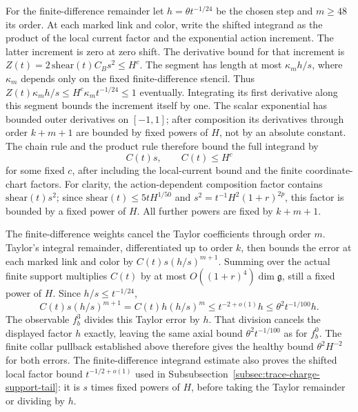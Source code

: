 For the finite-difference remainder let $h=\theta t^{-1/24}$ be the
chosen step and $m\ge48$ its order. At each marked link and color,
write the shifted integrand as the product of the local current factor
and the exponential action increment. The latter increment is zero at
zero shift. The derivative bound for that increment is
$Z(t)=2\,\mathrm{shear}(t)C_Bs^2\le H^c$. The segment has length at
most $\kappa_m h/s$, where $\kappa_m$ depends only on the fixed
finite-difference stencil. Thus
$Z(t)\kappa_m h/s\le H^c\kappa_m t^{-1/24}\le1$ eventually.
Integrating its first derivative along this segment bounds the increment
itself by one. The scalar exponential has bounded outer derivatives on
$[-1,1]$; after composition its derivatives through order $k+m+1$ are
bounded by fixed powers of $H$, not by an absolute constant. The chain
rule and the product rule therefore bound the full integrand by
\[
 C(t)s,\qquad C(t)\le H^c
\]
for some fixed $c$, after including the local-current bound and the
finite coordinate-chart factors. For clarity, the action-dependent
composition factor contains $\mathrm{shear}(t)s^2$; since
$\mathrm{shear}(t)\le5tH^{1/50}$ and
$s^2=t^{-1}H^2(1+r)^{2p}$, this factor is bounded by a fixed power of
$H$. All further powers are fixed by $k+m+1$.

The finite-difference weights cancel the Taylor coefficients through
order $m$. Taylor's integral remainder, differentiated up to order $k$,
then bounds the error at each marked link and color by
$C(t)s(h/s)^{m+1}$. Summing over the actual finite support multiplies
$C(t)$ by at most $O((1+r)^4)\dim\mathfrak g$, still a fixed power of
$H$. Since $h/s\le t^{-1/24}$,
\[
 C(t)s(h/s)^{m+1}
   = C(t)h(h/s)^m
   \le t^{-2+o(1)}h
   \le\theta^2t^{-1/100}h.
\]
The observable $f_b^3$ divides this Taylor error by $h$. That division
cancels the displayed factor $h$ exactly, leaving the same axial bound
$\theta^2t^{-1/100}$ as for $f_b^0$. The finite collar pullback established
above therefore gives the healthy bound $\theta^2H^{-2}$ for both errors.
The finite-difference integrand estimate also proves the shifted local
factor bound $t^{-1/2+o(1)}$ used in
Subsubsection~\ref{subsec:trace-charge-support-tail}: it is $s$ times fixed
powers of $H$, before taking the Taylor remainder or dividing by $h$.
